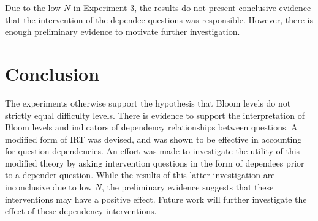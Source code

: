 \documentclass[]{interact}
\theoremstyle{plain}
\theoremstyle{definition}
\theoremstyle{remark}
\begin{document}
Due to the low $N$ in Experiment 3, the results do not present conclusive
evidence that the intervention of the dependee questions was responsible.
However, there is enough preliminary evidence to motivate further
investigation.  


\section{Conclusion}

The experiments otherwise support the hypothesis that Bloom levels do not
strictly equal difficulty levels.  There is evidence to support the
interpretation of Bloom levels and indicators of dependency relationships
between questions.  A modified form of IRT was devised, and was shown to be
effective in accounting for question dependencies.   An effort was made to
investigate the utility of this modified theory by asking intervention
questions in the form of dependees prior to a depender question.  While the
results of this latter investigation are inconclusive due to low $N$, the
preliminary evidence suggests that these interventions may have a positive
effect.  Future work will further investigate the effect of these dependency
interventions.



\end{document}
